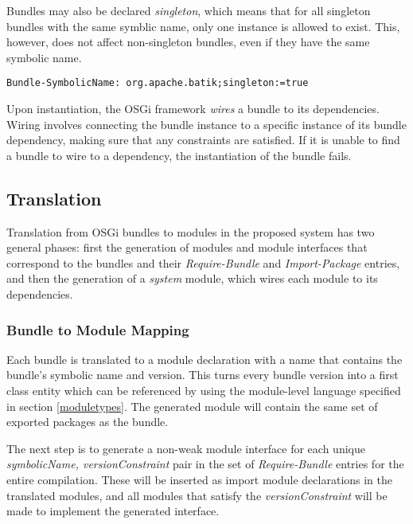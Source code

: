 Bundles may also be declared \textit{singleton}, which means that for all
singleton bundles with the same symblic name, only one instance is allowed to
exist. This, however, does not affect non-singleton bundles, even if they have
the same symbolic name.

\begin{lstlisting}[caption=Singleton Bundle]
Bundle-SymbolicName: org.apache.batik;singleton:=true
\end{lstlisting}

Upon instantiation, the OSGi framework \textit{wires} a bundle to its dependencies.
Wiring involves connecting the bundle instance to a specific instance of its bundle dependency, making
sure that any constraints are satisfied. If it is unable to find a bundle to wire to a
dependency, the instantiation of the bundle fails.

\subsection{Translation}

Translation from OSGi bundles to modules in the proposed system has two general phases:
first the generation of modules and module interfaces that correspond to the bundles and
their \textit{Require-Bundle} and \textit{Import-Package} entries, and then the generation of
a \textit{system} module, which wires each module to its dependencies.

\subsubsection{Bundle to Module Mapping}

Each bundle is translated to a module declaration with a name that contains the bundle's
symbolic name and version. This turns every bundle version into a first class entity which
can be referenced by using the module-level language specified in section \ref{moduletypes}.
The generated module will contain the same set of exported packages as the bundle.

The next step is to generate a non-weak module interface for each unique \textit{symbolicName, versionConstraint}
pair in the set of \textit{Require-Bundle} entries for the entire compilation. These will be inserted 
as import module declarations in the translated modules, and all modules that satisfy the \textit{versionConstraint}
will be made to implement the generated interface.

